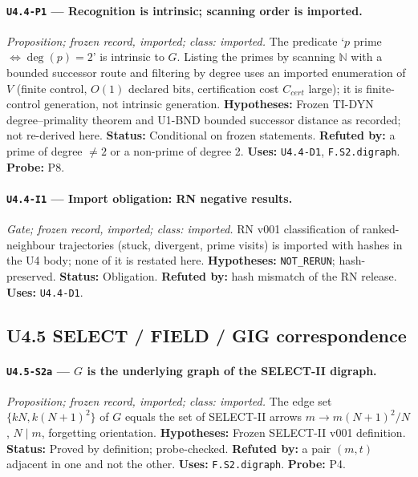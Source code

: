 \documentclass[11pt]{article}
\begin{document}
\paragraph{\texttt{U4.4-P1} --- Recognition is intrinsic; scanning order is imported.} \emph{Proposition; frozen record, imported; class: imported.} The predicate `$p$ prime $\iff\deg(p)=2$' is intrinsic to $G$. Listing the primes by scanning $\mathbb N$ with a bounded successor route and filtering by degree uses an imported enumeration of $V$ (finite control, $O(1)$ declared bits, certification cost $C_{cert}$ large); it is finite-control generation, not intrinsic generation. \textbf{Hypotheses:} Frozen TI-DYN degree--primality theorem and U1-BND bounded successor distance as recorded; not re-derived here. \textbf{Status:} Conditional on frozen statements. \textbf{Refuted by:} a prime of degree $\ne2$ or a non-prime of degree 2. \textbf{Uses:} \texttt{U4.4-D1}, \texttt{F.S2.digraph}. \textbf{Probe:} P8.

\paragraph{\texttt{U4.4-I1} --- Import obligation: RN negative results.} \emph{Gate; frozen record, imported; class: imported.} RN v001 classification of ranked-neighbour trajectories (stuck, divergent, prime visits) is imported with hashes in the U4 body; none of it is restated here. \textbf{Hypotheses:} \texttt{NOT\_RERUN}; hash-preserved. \textbf{Status:} Obligation. \textbf{Refuted by:} hash mismatch of the RN release. \textbf{Uses:} \texttt{U4.4-D1}.

\subsection{U4.5 SELECT / FIELD / GIG correspondence}
\paragraph{\texttt{U4.5-S2a} --- $G$ is the underlying graph of the SELECT-II digraph.} \emph{Proposition; frozen record, imported; class: imported.} The edge set $\{kN,k(N+1)^2\}$ of $G$ equals the set of SELECT-II arrows $m\to m(N+1)^2/N$, $N\mid m$, forgetting orientation. \textbf{Hypotheses:} Frozen SELECT-II v001 definition. \textbf{Status:} Proved by definition; probe-checked. \textbf{Refuted by:} a pair $(m,t)$ adjacent in one and not the other. \textbf{Uses:} \texttt{F.S2.digraph}. \textbf{Probe:} P4.
\end{document}
